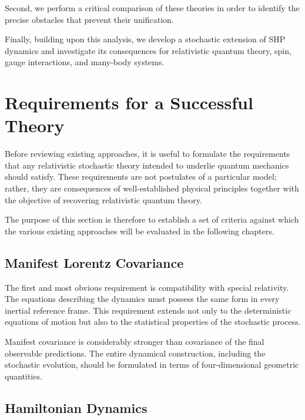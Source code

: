 Second, we perform a critical comparison of these theories in order to
identify the precise obstacles that prevent their unification.

Finally, building upon this analysis, we develop a stochastic extension
of SHP dynamics and investigate its consequences for relativistic
quantum theory, spin, gauge interactions, and many-body systems.
\section{Requirements for a Successful Theory}

Before reviewing existing approaches, it is useful to formulate the
requirements that any relativistic stochastic theory intended to
underlie quantum mechanics should satisfy. These requirements are not
postulates of a particular model; rather, they are consequences of
well-established physical principles together with the objective of
recovering relativistic quantum theory.

The purpose of this section is therefore to establish a set of criteria
against which the various existing approaches will be evaluated in the
following chapters.

\subsection{Manifest Lorentz Covariance}

The first and most obvious requirement is compatibility with special
relativity. The equations describing the dynamics must possess the same
form in every inertial reference frame. This requirement extends not
only to the deterministic equations of motion but also to the
statistical properties of the stochastic process.

Manifest covariance is considerably stronger than covariance of the
final observable predictions. The entire dynamical construction,
including the stochastic evolution, should be formulated in terms of
four-dimensional geometric quantities.

\subsection{Hamiltonian Dynamics}

